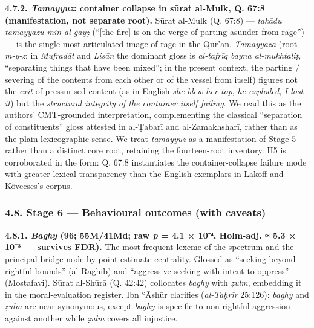 \textbf{4.7.2. \emph{Tamayyuz}: container collapse in sūrat al-Mulk, Q.
67:8 (manifestation, not separate root).} Sūrat al-Mulk (Q. 67:8) ---
\emph{takādu tamayyazu min al-ġayẓ} (``{[}the fire{]} is on the verge of
parting asunder from rage'') --- is the single most articulated image of
rage in the Qur'an. \emph{Tamayyaza} (root \emph{m-y-z}: in
\emph{Mufradāt} and \emph{Lisān} the dominant gloss is \emph{al-tafrīq
bayna al-mukhtaliṭ}, ``separating things that have been mixed''; in the
present context, the parting / severing of the contents from each other
or of the vessel from itself) figures not the \emph{exit} of pressurised
content (as in English \emph{she blew her top}, \emph{he exploded},
\emph{I lost it}) but the \emph{structural integrity of the container
itself failing}. We read this as the authors' CMT-grounded
interpretation, complementing the classical ``separation of
constituents'' gloss attested in al-Ṭabarī and al-Zamakhsharī, rather
than as the plain lexicographic sense. We treat \emph{tamayyuz} as a
manifestation of Stage 5 rather than a distinct core root, retaining the
fourteen-root inventory. H5 is corroborated in the form: Q. 67:8
instantiates the container-collapse failure mode with greater lexical
transparency than the English exemplars in Lakoff and Kövecses's corpus.

\subsubsection{4.8. Stage 6 --- Behavioural outcomes (with
caveats)}\label{stage-6-behavioural-outcomes-with-caveats}

\textbf{4.8.1. \emph{Baghy} (96; 55M/41Md; raw \emph{p} = 4.1 × 10⁻⁴,
Holm-adj. ≈ 5.3 × 10⁻³ --- survives FDR).} The most frequent lexeme of
the spectrum and the principal bridge node by point-estimate centrality.
Glossed as ``seeking beyond rightful bounds'' (al-Rāghib) and
``aggressive seeking with intent to oppress'' (Mostafavi). Sūrat
al-Shūrā (Q. 42:42) collocates \emph{baghy} with \emph{ẓulm}, embedding
it in the moral-evaluation register. Ibn ʿĀshūr clarifies
(\emph{al-Taḥrīr} 25:126): \emph{baghy} and \emph{ẓulm} are
near-synonymous, except \emph{baghy} is specific to non-rightful
aggression against another while \emph{ẓulm} covers all injustice.

